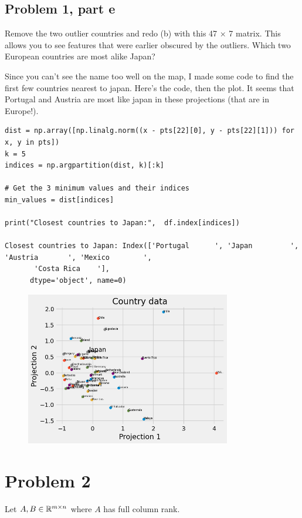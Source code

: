 \subsection{Problem 1, part e}
Remove the two outlier countries and redo (b) with this 47 × 7 matrix. This allows you to see features that were earlier obscured by the outliers. Which two European countries are most alike Japan?
\partbreak
\begin{solution}
    Since you can't see the name too well on the map, I made some code to find the first few countries nearest to japan. Here's the code, then the plot. It seems that Portugal and Austria are most like japan in these projections (that are in Europe!).

    \begin{lstlisting}
dist = np.array([np.linalg.norm((x - pts[22][0], y - pts[22][1])) for x, y in pts])
k = 5
indices = np.argpartition(dist, k)[:k]

# Get the 3 minimum values and their indices
min_values = dist[indices]

print("Closest countries to Japan:",  df.index[indices])

Closest countries to Japan: Index(['Portugal      ', 'Japan         ', 'Austria       ', 'Mexico        ',
       'Costa Rica    '],
      dtype='object', name=0)
    \end{lstlisting}

    \begin{figure}[h]
        \centering
        \includegraphics[width = 0.8\textwidth]{Images/japan.png}
        \label{fig:p1e}
    \end{figure}
\end{solution}
\newpage
\section{Problem 2}
Let $A, B \in \mathbb{R}^{m \times n}$ where $A$ has full column rank.


